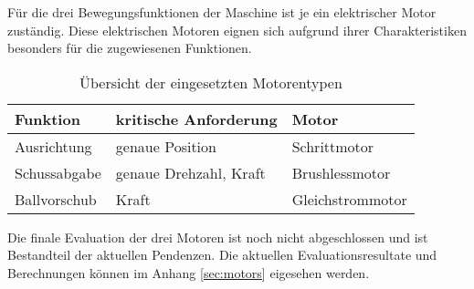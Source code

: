 
Für die drei Bewegungsfunktionen der Maschine ist je ein elektrischer
Motor zuständig. Diese elektrischen Motoren eignen sich aufgrund ihrer
Charakteristiken besonders für die zugewiesenen Funktionen. 

\begin{table}[h!]
	\centering
	\begin{tabular}{l l l}
		Funktion & kritische Anforderung & Motor \\
		\hline
		Ausrichtung
			& genaue Position
			& Schrittmotor \\
		Schussabgabe
			& genaue Drehzahl, Kraft
			& Brushlessmotor \\
		Ballvorschub
			& Kraft
			& Gleichstrommotor \\
	\end{tabular}
	\caption{Übersicht der eingesetzten Motorentypen}
\end{table}

Die finale Evaluation der drei Motoren ist noch nicht abgeschlossen
und ist Bestandteil der aktuellen Pendenzen. Die aktuellen
Evaluationsresultate und Berechnungen können im Anhang \ref{sec:motors}
eigesehen werden.
